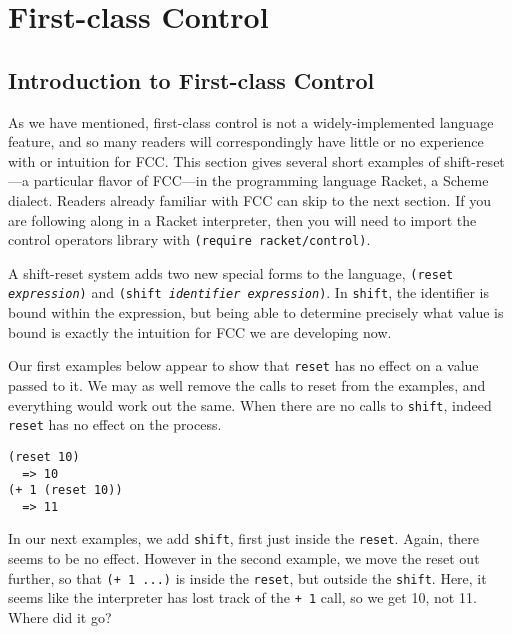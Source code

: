 \documentclass[11pt]{article}
\newcommand{\maybePage}{\null}
\begin{document}
%


\maybePage
\section{First-class Control}
\label{sec:FCC}

\subsection{Introduction to First-class Control}
\label{subsec:intro-to-fcc}

As we have mentioned, first-class control is not a widely-implemented language feature, and so many readers will correspondingly have little or no experience with or intuition for FCC.
This section gives several short examples of shift-reset---a particular flavor of FCC---in the programming language Racket, a Scheme dialect.
Readers already familiar with FCC can skip to the next section.
If you are following along in a Racket interpreter, then you will need to import the control operators library with \texttt{(require racket/control)}.

A shift-reset system adds two new special forms to the language, \texttt{(reset \textit{expression})} and \texttt{(shift \textit{identifier expression})}.
In \texttt{shift}, the identifier is bound within the expression, but being able to determine precisely what value is bound is exactly the intuition for FCC we are developing now.

Our first examples below appear to show that \texttt{reset} has no effect on a value passed to it.
We may as well remove the calls to reset from the examples, and everything would work out the same.
When there are no calls to \texttt{shift}, indeed \texttt{reset} has no effect on the process.

\begin{verbatim}
(reset 10)
  => 10
(+ 1 (reset 10))
  => 11
\end{verbatim}

In our next examples, we add \texttt{shift}, first just inside the \texttt{reset}.
Again, there seems to be no effect.
However in the second example, we move the reset out further, so that \texttt{(+ 1 ...)} is inside the \texttt{reset}, but outside the \texttt{shift}.
Here, it seems like the interpreter has lost track of the \texttt{+ 1} call, so we get 10, not 11.
Where did it go?
\end{document}
